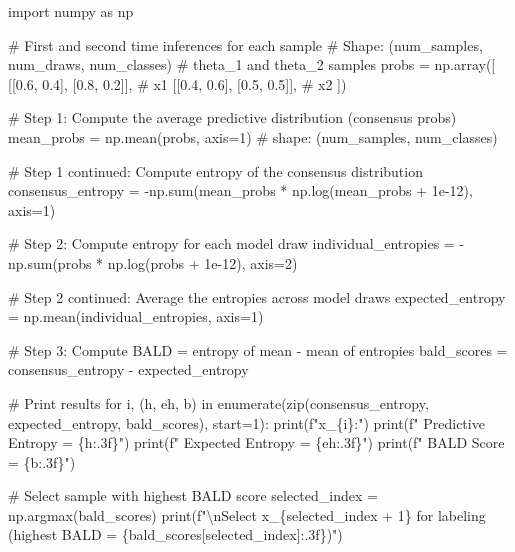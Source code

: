 \documentclass[
  letterpaper,
  numbers=noenddot,
  DIV=11]{scrreprt}
\newenvironment{Shaded}{\begin{snugshade}}{\end{snugshade}}
\newcommand{\NormalTok}[1]{\textcolor[rgb]{0.00,0.23,0.31}{#1}}
\theoremstyle{plain}
\theoremstyle{definition}
\theoremstyle{remark}
\begin{document}
\begin{tcolorbox}[colframe=.grey, title=\faCode \enspace Code]

\begin{Shaded}
\begin{Highlighting}[numbers=left,,]
\NormalTok{import numpy as np}

\NormalTok{\# First and second time inferences for each sample}
\NormalTok{\# Shape: (num\_samples, num\_draws, num\_classes)}
\NormalTok{\# theta\_1 and theta\_2 samples}
\NormalTok{probs = np.array([}
\NormalTok{    [[0.6, 0.4], [0.8, 0.2]],  \# x1}
\NormalTok{    [[0.4, 0.6], [0.5, 0.5]],  \# x2}
\NormalTok{])}

\NormalTok{\# Step 1: Compute the average predictive distribution (consensus probs)}
\NormalTok{mean\_probs = np.mean(probs, axis=1)  \# shape: (num\_samples, num\_classes)}

\NormalTok{\# Step 1 continued: Compute entropy of the consensus distribution}
\NormalTok{consensus\_entropy = {-}np.sum(mean\_probs * np.log(mean\_probs + 1e{-}12), axis=1)}

\NormalTok{\# Step 2: Compute entropy for each model draw}
\NormalTok{individual\_entropies = {-}np.sum(probs * np.log(probs + 1e{-}12), axis=2)}

\NormalTok{\# Step 2 continued: Average the entropies across model draws}
\NormalTok{expected\_entropy = np.mean(individual\_entropies, axis=1)}

\NormalTok{\# Step 3: Compute BALD = entropy of mean {-} mean of entropies}
\NormalTok{bald\_scores = consensus\_entropy {-} expected\_entropy}

\NormalTok{\# Print results}
\NormalTok{for i, (h, eh, b) in enumerate(zip(consensus\_entropy, expected\_entropy, bald\_scores), start=1):}
\NormalTok{    print(f"x\_\{i\}:")}
\NormalTok{    print(f"  Predictive Entropy = \{h:.3f\}")}
\NormalTok{    print(f"  Expected Entropy   = \{eh:.3f\}")}
\NormalTok{    print(f"  BALD Score         = \{b:.3f\}")}

\NormalTok{\# Select sample with highest BALD score}
\NormalTok{selected\_index = np.argmax(bald\_scores)}
\NormalTok{print(f"\textbackslash{}nSelect x\_\{selected\_index + 1\} for labeling (highest BALD = \{bald\_scores[selected\_index]:.3f\})")}
\end{Highlighting}
\end{Shaded}

\end{tcolorbox}
\end{document}
